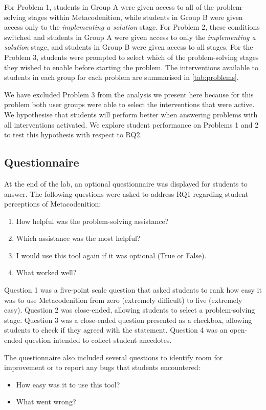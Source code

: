 \documentclass[sigconf,anonymous]{acmart}
\begin{document}
For Problem 1, students in Group A were given access to all of the problem-solving stages within Metacodenition, while students in Group B were given access only to the \emph{implementing a solution} stage. For Problem 2, these conditions switched and students in Group A were given access to only the \emph{implementing a solution} stage, and students in Group B were given access to all stages. For the Problem 3, students were prompted to select which of the problem-solving stages they wished to enable before starting the problem. The interventions available to students in each group for each problem are summarised in \autoref{tab:problems}.

We have excluded Problem 3 from the analysis we present here because for this problem both user groups were able to select the interventions that were active. We hypothesise that students will perform better when answering problems with all interventions activated.  We explore student performance on Problems 1 and 2 to test this hypothesis with respect to RQ2.

\subsection{Questionnaire} \label{sec:evaluation-questionnaire}
At the end of the lab, an optional questionnaire was displayed for students to answer. The following questions were asked to address RQ1 regarding student perceptions of Metacodenition:
\begin{enumerate}
    \item How helpful was the problem-solving assistance?
    \item Which assistance was the most helpful?
    \item I would use this tool again if it was optional (True or False).
    \item What worked well?
\end{enumerate}
Question 1 was a five-point scale question that asked students to rank how easy it was to use Metacodenition from zero (extremely difficult) to five (extremely easy). Question 2 was close-ended, allowing students to select a problem-solving stage. Question 3 was a close-ended question presented as a checkbox, allowing students to check if they agreed with the statement. Question 4 was an open-ended question intended to collect student anecdotes.

The questionnaire also included several questions to identify room for improvement or to report any bugs that students encountered:
\begin{itemize}
    \item How easy was it to use this tool?
    \item What went wrong?
\end{itemize}
\end{document}
